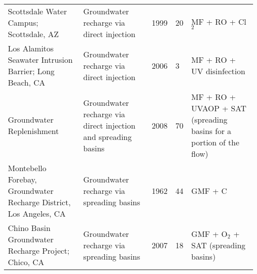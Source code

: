 \documentclass{article}
\begin{document}
\begin{table}[]
\begin{tabular}{lllll}
Scottsdale Water Campus; Scottsdale, AZ                            & Groundwater recharge via direct injection                      & 1999 & 20             & MF + RO + Cl$_2$ \\
Los Alamitos Seawater Intrusion Barrier; Long Beach, CA            & Groundwater recharge via direct injection                      & 2006 & 3              & MF + RO + UV disinfection                                          \\
Groundwater Replenishment                                          & Groundwater recharge via direct injection and spreading basins & 2008 & 70             & MF + RO + UVAOP + SAT (spreading basins for a portion of the flow) \\
Montebello Forebay, Groundwater Recharge District, Los Angeles, CA & Groundwater recharge via spreading basins                      & 1962 & 44             & GMF + C                                                            \\
Chino Basin Groundwater Recharge Project; Chico, CA                & Groundwater recharge via spreading basins                      & 2007 & 18             & GMF + O$_2$ + SAT (spreading basins)
\end{tabular}
\end{table}
\end{document}
